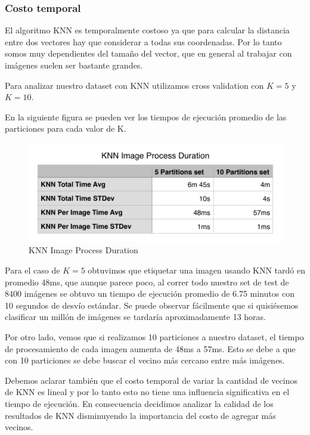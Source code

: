 \subsubsection{Costo temporal}

El algoritmo KNN es temporalmente costoso ya que para calcular la distancia entre dos vectores hay que considerar a todas sus coordenadas. Por lo tanto somos muy dependientes del tamaño del vector, que en general al trabajar con imágenes suelen ser bastante grandes.


Para analizar nuestro dataset con KNN utilizamos cross validation con $K = 5$ y $K = 10$.

En la siguiente figura se pueden ver los tiempos de ejecución promedio de las particiones para cada valor de K.

\begin{figure}[h!]
  \begin{center}
	\includegraphics[scale=0.7]{exp1/KNN-Image-Process-Duration.png}
	\caption{KNN Image Process Duration}
  \end{center}
\end{figure}


Para el caso de $K = 5$ obtuvimos que etiquetar una imagen usando KNN tardó en promedio 48ms, que aunque parece poco, al correr todo nuestro set de test de 8400 imágenes se obtuvo un tiempo de ejecución promedio de 6.75 minutos con 10 segundos de desvío estándar. Se puede observar fácilmente que si quisiésemos clasificar un millón de imágenes se tardaría aproximadamente 13 horas.

Por otro lado, vemos que si realizamos 10 particiones a nuestro dataset, el tiempo de procesamiento de cada imagen aumenta de 48ms a 57ms. Esto se debe a que con 10 particiones se debe buscar el vecino más cercano entre más imágenes.

Debemos aclarar también que el costo temporal de variar la cantidad de vecinos de KNN es lineal y por lo tanto esto no tiene una influencia significativa en el tiempo de ejecución. En consecuencia decidimos analizar la calidad de los resultados de KNN disminuyendo la importancia del costo de agregar más vecinos.

